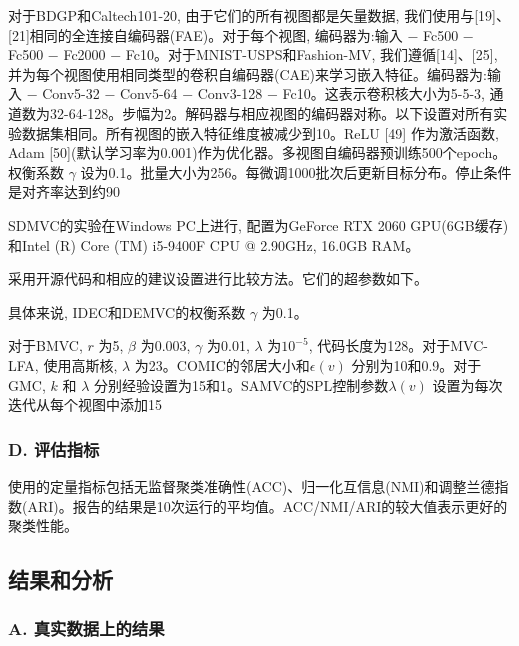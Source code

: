 \documentclass{article}
\begin{document}
对于BDGP和Caltech101-20, 由于它们的所有视图都是矢量数据, 我们使用与[19]、[21]相同的全连接自编码器(FAE)。对于每个视图, 编码器为:输入 − Fc500 − Fc500 − Fc2000 − Fc10。对于MNIST-USPS和Fashion-MV, 我们遵循[14]、[25], 并为每个视图使用相同类型的卷积自编码器(CAE)来学习嵌入特征。编码器为:输入 − Conv5-32 − Conv5-64 − Conv3-128 − Fc10。这表示卷积核大小为5-5-3, 通道数为32-64-128。步幅为2。解码器与相应视图的编码器对称。以下设置对所有实验数据集相同。所有视图的嵌入特征维度被减少到10。ReLU [49] 作为激活函数, Adam [50](默认学习率为0.001)作为优化器。多视图自编码器预训练500个epoch。权衡系数 $\gamma$ 设为0.1。批量大小为256。每微调1000批次后更新目标分布。停止条件是对齐率达到约90%

SDMVC的实验在Windows PC上进行, 配置为GeForce RTX 2060 GPU(6GB缓存)和Intel (R) Core (TM) i5-9400F CPU @ 2.90GHz, 16.0GB RAM。

采用开源代码和相应的建议设置进行比较方法。它们的超参数如下。

具体来说, IDEC和DEMVC的权衡系数 $\gamma$ 为0.1。

对于BMVC, $r$ 为5, $\beta$ 为0.003, $\gamma$ 为0.01, $\lambda$ 为$10^{-5}$, 代码长度为128。对于MVC-LFA, 使用高斯核, $\lambda$ 为23。COMIC的邻居大小和$\epsilon(v)$ 分别为10和0.9。对于GMC, $k$ 和 $\lambda$ 分别经验设置为15和1。SAMVC的SPL控制参数$\lambda(v)$ 设置为每次迭代从每个视图中添加15%


\subsubsection*{D. 评估指标}

使用的定量指标包括无监督聚类准确性(ACC)、归一化互信息(NMI)和调整兰德指数(ARI)。报告的结果是10次运行的平均值。ACC/NMI/ARI的较大值表示更好的聚类性能。

\subsection{结果和分析}

\subsubsection*{A. 真实数据上的结果}
\end{document}
